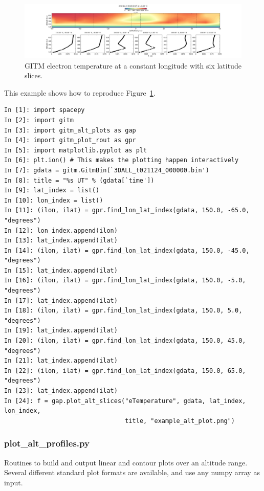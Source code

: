 \begin{figure}
\begin{center}
\noindent\includegraphics[width=\textwidth]{Figures/gitm_alt_slice_test_Te.png}
\caption{GITM electron temperature at a constant longitude with six latitude slices.}
\label{gitm_alt_slices.fig}
\end{center}
\end{figure}

This example shows how to reproduce Figure~\ref{gitm_alt_slices.fig}.

\begin{verbatim}
In [1]: import spacepy
In [2]: import gitm
In [3]: import gitm_alt_plots as gap
In [4]: import gitm_plot_rout as gpr
In [5]: import matplotlib.pyplot as plt
In [6]: plt.ion() # This makes the plotting happen interactively
In [7]: gdata = gitm.GitmBin(`3DALL_t021124_000000.bin')
In [8]: title = "%s UT" % (gdata[`time'])
In [9]: lat_index = list()
In [10]: lon_index = list()
In [11]: (ilon, ilat) = gpr.find_lon_lat_index(gdata, 150.0, -65.0, "degrees")
In [12]: lon_index.append(ilon)
In [13]: lat_index.append(ilat)
In [14]: (ilon, ilat) = gpr.find_lon_lat_index(gdata, 150.0, -45.0, "degrees")
In [15]: lat_index.append(ilat)
In [16]: (ilon, ilat) = gpr.find_lon_lat_index(gdata, 150.0, -5.0, "degrees")
In [17]: lat_index.append(ilat)
In [18]: (ilon, ilat) = gpr.find_lon_lat_index(gdata, 150.0, 5.0, "degrees")
In [19]: lat_index.append(ilat)
In [20]: (ilon, ilat) = gpr.find_lon_lat_index(gdata, 150.0, 45.0, "degrees")
In [21]: lat_index.append(ilat)
In [22]: (ilon, ilat) = gpr.find_lon_lat_index(gdata, 150.0, 65.0, "degrees")
In [23]: lat_index.append(ilat)
In [24]: f = gap.plot_alt_slices("eTemperature", gdata, lat_index, lon_index, 
                                 title, "example_alt_plot.png")
\end{verbatim}

\subsubsection{plot\_alt\_profiles.py}

Routines to build and output linear and contour plots over an altitude range.  Several different standard plot formats are available, and use any numpy array as input.

